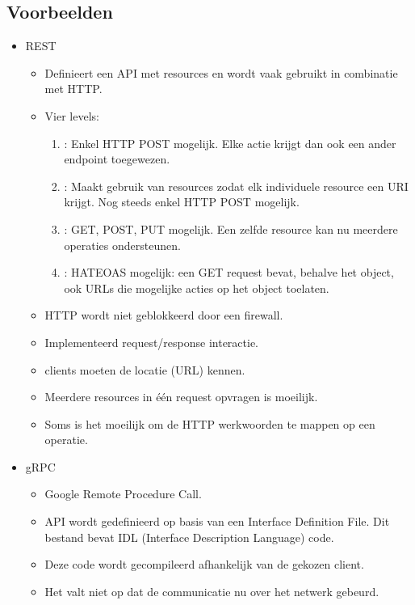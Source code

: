 	\subsection{Voorbeelden}
	\begin{itemize}
		\item[\info] REST
		\begin{itemize}
			\item[\info] Definieert een API met resources en wordt vaak gebruikt in combinatie met HTTP.
			\item[\info] Vier levels:
			\begin{enumerate}
				\item[0]: Enkel HTTP POST mogelijk. Elke actie krijgt dan ook een ander endpoint toegewezen.
				\item[1]: Maakt gebruik van resources zodat elk individuele resource een URI krijgt. Nog steeds enkel HTTP POST mogelijk.
				\item[2]: GET, POST, PUT mogelijk. Een zelfde resource kan nu meerdere operaties ondersteunen.
				\item[3]: HATEOAS mogelijk: een GET request bevat, behalve het object, ook URLs die mogelijke acties op het object toelaten.
			\end{enumerate}
			\item[\good] HTTP wordt niet geblokkeerd door een firewall.
			\item[\good] Implementeerd request/response interactie.
			\item[\alert] clients moeten de locatie (URL) kennen.
			\item[\alert] Meerdere resources in één request opvragen is moeilijk. 
			\item[\alert] Soms is het moeilijk om de HTTP werkwoorden te mappen op een operatie.
		\end{itemize}
		\item[\info] gRPC
		\begin{itemize}
			\item[\info] Google Remote Procedure Call.
			\item[\info] API wordt gedefinieerd op basis van een Interface Definition File. Dit bestand bevat IDL (Interface Description Language) code.
			\item[\info] Deze code wordt gecompileerd afhankelijk van de gekozen client.
			\item[\alert] Het valt niet op dat de communicatie nu over het netwerk gebeurd.
		\end{itemize}
	\end{itemize}
